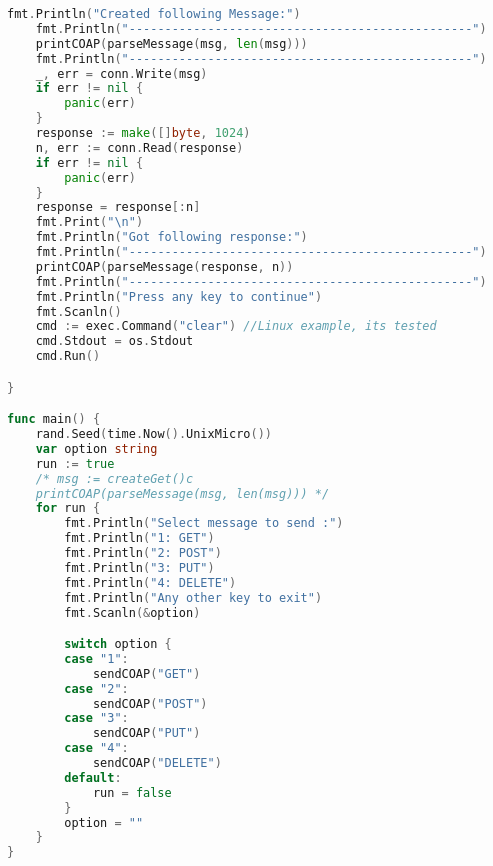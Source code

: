 \documentclass{article}
\begin{document}
\begin{appendices}
\begin{lstlisting}[language=go]
	fmt.Println("Created following Message:")
	fmt.Println("------------------------------------------------")
	printCOAP(parseMessage(msg, len(msg)))
	fmt.Println("------------------------------------------------")
	_, err = conn.Write(msg)
	if err != nil {
		panic(err)
	}
	response := make([]byte, 1024)
	n, err := conn.Read(response)
	if err != nil {
		panic(err)
	}
	response = response[:n]
	fmt.Print("\n")
	fmt.Println("Got following response:")
	fmt.Println("------------------------------------------------")
	printCOAP(parseMessage(response, n))
	fmt.Println("------------------------------------------------")
	fmt.Println("Press any key to continue")
	fmt.Scanln()
	cmd := exec.Command("clear") //Linux example, its tested
	cmd.Stdout = os.Stdout
	cmd.Run()

}

func main() {
	rand.Seed(time.Now().UnixMicro())
	var option string
	run := true
	/* msg := createGet()c
	printCOAP(parseMessage(msg, len(msg))) */
	for run {
		fmt.Println("Select message to send :")
		fmt.Println("1: GET")
		fmt.Println("2: POST")
		fmt.Println("3: PUT")
		fmt.Println("4: DELETE")
		fmt.Println("Any other key to exit")
		fmt.Scanln(&option)

		switch option {
		case "1":
			sendCOAP("GET")
		case "2":
			sendCOAP("POST")
		case "3":
			sendCOAP("PUT")
		case "4":
			sendCOAP("DELETE")
		default:
			run = false
		}
		option = ""
	}
}

        \end{lstlisting}

    \end{appendices}
\end{document}
